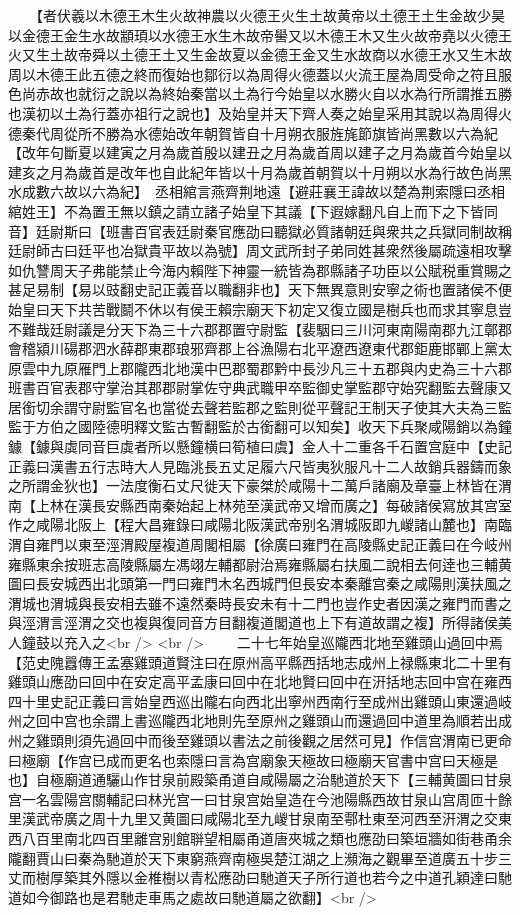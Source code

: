 　　【者伏羲以木德王木生火故神農以火德王火生土故黄帝以土德王土生金故少昊以金德王金生水故顓頊以水德王水生木故帝嚳又以木德王木又生火故帝堯以火德王火又生土故帝舜以土德王土又生金故夏以金德王金又生水故商以水德王水又生木故周以木德王此五德之終而復始也鄒衍以為周得火德蓋以火流王屋為周受命之符且服色尚赤故也就衍之說以為終始秦當以土為行今始皇以水勝火自以水為行所謂推五勝也漢初以土為行蓋亦祖行之說也】及始皇并天下齊人奏之始皇采用其說以為周得火德秦代周從所不勝為水德始改年朝賀皆自十月朔衣服旌旄節旗皆尚黑數以六為紀【改年句斷夏以建寅之月為歲首殷以建丑之月為歲首周以建子之月為歲首今始皇以建亥之月為歲首是改年也自此紀年皆以十月為歲首朝賀以十月朔以水為行故色尚黑水成數六故以六為紀】　丞相綰言燕齊荆地遠【避莊襄王諱故以楚為荆索隱曰丞相綰姓王】不為置王無以鎮之請立諸子始皇下其議【下遐嫁翻凡自上而下之下皆同音】廷尉斯曰【班書百官表廷尉秦官應劭曰聽獄必質諸朝廷與衆共之兵獄同制故稱廷尉師古曰廷平也冶獄貴平故以為號】周文武所封子弟同姓甚衆然後屬疏遠相攻擊如仇讐周天子弗能禁止今海内賴陛下神靈一統皆為郡縣諸子功臣以公賦税重賞賜之甚足易制【易以豉翻史記正義音以職翻非也】天下無異意則安寧之術也置諸侯不便始皇曰天下共苦戰鬬不休以有侯王賴宗廟天下初定又復立國是樹兵也而求其寧息豈不難哉廷尉議是分天下為三十六郡郡置守尉監【裴駰曰三川河東南陽南郡九江鄣郡會稽潁川碭郡泗水薛郡東郡琅邪齊郡上谷漁陽右北平遼西遼東代郡鉅鹿邯鄲上黨太原雲中九原雁門上郡隴西北地漢中巴郡蜀郡黔中長沙凡三十五郡與内史為三十六郡班書百官表郡守掌治其郡郡尉掌佐守典武職甲卒監御史掌監郡守始究翻監去聲康又居銜切余謂守尉監官名也當從去聲若監郡之監則從平聲記王制天子使其大夫為三監監于方伯之國陸德明釋文監古暫翻監於古銜翻可以知矣】收天下兵聚咸陽銷以為鐘鐻【鐻與虡同音巨虡者所以懸鐘横曰筍植曰虞】金人十二重各千石置宫庭中【史記正義曰漢書五行志時大人見臨洮長五丈足履六尺皆夷狄服凡十二人故銷兵器鑄而象之所謂金狄也】一法度衡石丈尺徙天下豪桀於咸陽十二萬戶諸廟及章臺上林皆在渭南【上林在漢長安縣西南秦始起上林苑至漢武帝又增而廣之】每破諸侯寫放其宫室作之咸陽北阪上【程大昌雍錄曰咸陽北阪漢武帝别名渭城阪即九嵕諸山麓也】南臨渭自雍門以東至涇渭殿屋複道周閣相屬【徐廣曰雍門在高陵縣史記正義曰在今岐州雍縣東余按班志高陵縣屬左馮翊左輔都尉治焉雍縣屬右扶風二說相去何逹也三輔黄圖曰長安城西出北頭第一門曰雍門木名西城門但長安本秦離宫秦之咸陽則漢扶風之渭城也渭城與長安相去雖不遠然秦時長安未有十二門也豈作史者因漢之雍門而書之與涇渭言涇渭之交也複與復同音方目翻複道閣道也上下有道故謂之複】所得諸侯美人鐘鼓以充入之<br />
<br />
　　二十七年始皇巡隴西北地至雞頭山過回中焉【范史隗囂傳王孟塞雞頭道賢注曰在原州高平縣西括地志成州上禄縣東北二十里有雞頭山應劭曰回中在安定高平孟康曰回中在北地賢曰回中在汧括地志回中宫在雍西四十里史記正義曰言始皇西巡出隴右向西北出寧州西南行至成州出雞頭山東還過岐州之回中宫也余謂上書巡隴西北地則先至原州之雞頭山而還過回中道里為順若出成州之雞頭則須先過回中而後至雞頭以書法之前後觀之居然可見】作信宫渭南已更命曰極廟【作宫已成而更名也索隱曰言為宫廟象天極故曰極廟天官書中宫曰天極是也】自極廟道通驪山作甘泉前殿築甬道自咸陽屬之治馳道於天下【三輔黄圖曰甘泉宫一名雲陽宫關輔記曰林光宫一曰甘泉宫始皇造在今池陽縣西故甘泉山宫周匝十餘里漢武帝廣之周十九里又黄圖曰咸陽北至九嵕甘泉南至鄠杜東至河西至汧渭之交東西八百里南北四百里離宫别館聨望相屬甬道唐夾城之類也應劭曰築垣牆如街巷甬余隴翻賈山曰秦為馳道於天下東窮燕齊南極吳楚江湖之上瀕海之觀畢至道廣五十步三丈而樹厚築其外隱以金椎樹以青松應劭曰馳道天子所行道也若今之中道孔穎達曰馳道如今御路也是君馳走車馬之處故曰馳道屬之欲翻】<br />
